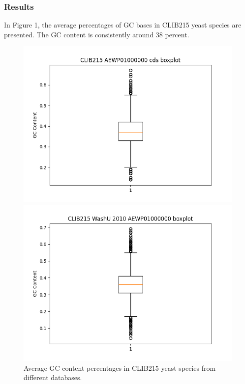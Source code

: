 \documentclass{beamer}
\begin{document}
\begin{frame}
  \frametitle{Results}
    In Figure 1, the average percentages of GC bases in CLIB215 yeast species are presented. The GC content is consistently around 38 percent.
  \begin{figure}
    \centering
    \begin{minipage}{0.48\textwidth}
      \includegraphics[width=\linewidth]{images/CLIB215_AEWP01000000_cds_boxplot.png}
    \end{minipage}\hfill
    \begin{minipage}{0.48\textwidth}
      \includegraphics[width=\linewidth]{images/CLIB215_WashU_2010_AEWP01000000_boxplot.png}
    \end{minipage}
    \caption{Average GC content percentages in CLIB215 yeast species from different databases.}
  \end{figure}
\end{frame}
\end{document}
